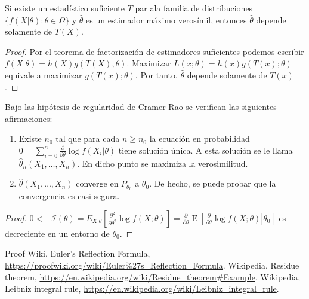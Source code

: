 \documentclass{article}
\begin{document}
    \begin{prop}
        Si existe un estadístico suficiente $T$ par ala familia de distribuciones $\{f(X|\theta): \theta \in \Omega\}$ y $\hat\theta$ es un estimador máximo verosímil, entonces $\hat\theta$ depende solamente de $T(X)$.
    \end{prop}
    \begin{proof}
        Por el teorema de factorización de estimadores suficientes podemos escribir $f(X|\theta) = h(X) g(T(X), \theta)$. Maximizar $L(x; \theta) = h(x) g(T(x); \theta)$ equivale a maximizar $g(T(x); \theta)$. Por tanto, $\hat\theta$ depende solamente de $T(x)$.
    \end{proof}

    \begin{thm}
        Bajo las hipótesis de regularidad de Cramer-Rao se verifican las siguientes afirmaciones:
        \begin{enumerate}
            \item Existe $n_0$ tal que para cada $n \ge n_0$ la ecuación en probabilidad $0 =\sum_{i=0}^n \frac{\partial}{\partial \theta} \log f(X_i | \theta)$ tiene solución única. A esta solución se le llama $\hat{\theta}_n(X_1, \ldots, X_n)$. En dicho punto se maximiza la verosimilitud.
            \item $\hat{\theta}(X_1, \ldots, X_n)$ converge en $P_{\theta_0}$ a $\theta_0$. De hecho, se puede probar que la convergencia es casi segura.
        \end{enumerate}
    \end{thm}
    \begin{proof}
        $0 < -\mathcal{I}(\theta)=E_{X|\theta}\left[ \frac{\partial^2}{\partial\theta^2} \log f(X;\theta)\right] = \frac{\partial}{\partial\theta} \operatorname{E} \left[\left. \frac{\partial}{\partial\theta} \log f(X;\theta)\right|\theta_0 \right]$
        es decreciente en un entorno de $\theta_0$.
    \end{proof}

\begin{thebibliography}{99}
 Proof Wiki, Euler's Reflection Formula, \url{https://proofwiki.org/wiki/Euler%27s_Reflection_Formula}.
 Wikipedia, Residue theorem, \url{https://en.wikipedia.org/wiki/Residue_theorem#Example}.
 Wikipedia, Leibniz integral rule, \url{https://en.wikipedia.org/wiki/Leibniz_integral_rule}.
\end{thebibliography}
\end{document}
